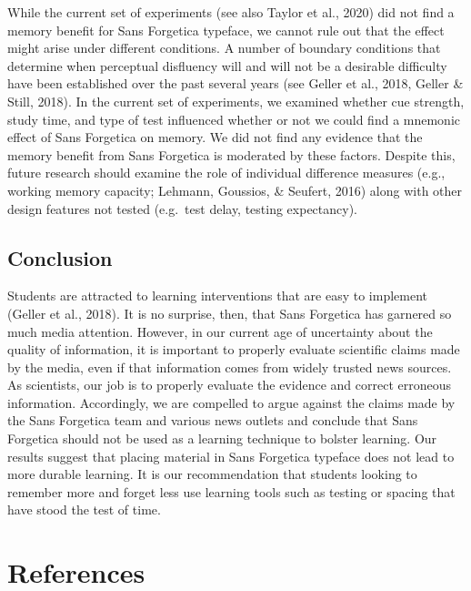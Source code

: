 \documentclass[
  english,
  jou]{apa6}
\begin{document}
While the current set of experiments (see also Taylor et al., 2020) did not find a memory benefit for Sans Forgetica typeface, we cannot rule out that the effect might arise under different conditions. A number of boundary conditions that determine when perceptual disfluency will and will not be a desirable difficulty have been established over the past several years (see Geller et al., 2018, Geller \& Still, 2018). In the current set of experiments, we examined whether cue strength, study time, and type of test influenced whether or not we could find a mnemonic effect of Sans Forgetica on memory. We did not find any evidence that the memory benefit from Sans Forgetica is moderated by these factors. Despite this, future research should examine the role of individual difference measures (e.g., working memory capacity; Lehmann, Goussios, \& Seufert, 2016) along with other design features not tested (e.g.~test delay, testing expectancy).

\hypertarget{conclusion}{%
\subsection{Conclusion}\label{conclusion}}

Students are attracted to learning interventions that are easy to implement (Geller et al., 2018). It is no surprise, then, that Sans Forgetica has garnered so much media attention. However, in our current age of uncertainty about the quality of information, it is important to properly evaluate scientific claims made by the media, even if that information comes from widely trusted news sources. As scientists, our job is to properly evaluate the evidence and correct erroneous information. Accordingly, we are compelled to argue against the claims made by the Sans Forgetica team and various news outlets and conclude that Sans Forgetica should not be used as a learning technique to bolster learning. Our results suggest that placing material in Sans Forgetica typeface does not lead to more durable learning. It is our recommendation that students looking to remember more and forget less use learning tools such as testing or spacing that have stood the test of time.

\newpage

\hypertarget{references}{%
\section{References}\label{references}}

\begingroup
\setlength{\parindent}{-0.5in}
\setlength{\leftskip}{0.5in}
\end{document}
